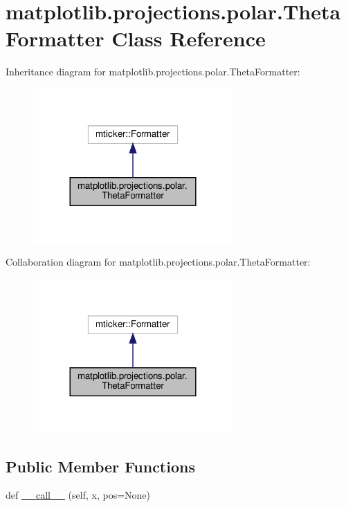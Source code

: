 \hypertarget{classmatplotlib_1_1projections_1_1polar_1_1ThetaFormatter}{}\section{matplotlib.\+projections.\+polar.\+Theta\+Formatter Class Reference}
\label{classmatplotlib_1_1projections_1_1polar_1_1ThetaFormatter}


Inheritance diagram for matplotlib.\+projections.\+polar.\+Theta\+Formatter\+:
\nopagebreak
\begin{figure}[H]
\begin{center}
\leavevmode
\includegraphics[width=216pt]{classmatplotlib_1_1projections_1_1polar_1_1ThetaFormatter__inherit__graph}
\end{center}
\end{figure}


Collaboration diagram for matplotlib.\+projections.\+polar.\+Theta\+Formatter\+:
\nopagebreak
\begin{figure}[H]
\begin{center}
\leavevmode
\includegraphics[width=216pt]{classmatplotlib_1_1projections_1_1polar_1_1ThetaFormatter__coll__graph}
\end{center}
\end{figure}
\subsection*{Public Member Functions}
\begin{DoxyCompactItemize}
\item 
def \hyperlink{classmatplotlib_1_1projections_1_1polar_1_1ThetaFormatter_a1c471f30d3e265087849d64cf0dbf4d2}{\+\_\+\+\_\+call\+\_\+\+\_\+} (self, x, pos=None)
\end{DoxyCompactItemize}


